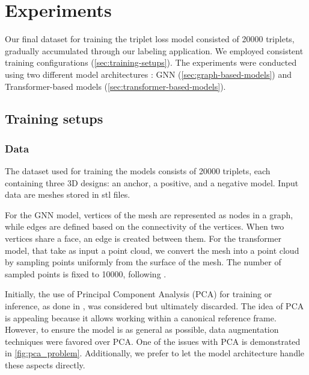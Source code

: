 \chapter{Experiments}
\label{sec:experiments}

Our final dataset for training the triplet loss model consisted of 20000 triplets, gradually accumulated through our labeling application. We employed consistent training configurations (\autoref{sec:training-setups}). The experiments were conducted using two different model architectures : GNN (\autoref{sec:graph-based-models}) and Transformer-based models (\autoref{sec:transformer-based-models}). 

\section{Training setups}
\label{sec:training-setups}

\subsection{Data}

The dataset used for training the models consists of 20000 triplets, each containing three 3D designs: an anchor, a positive, and a negative model. Input data are meshes stored in stl files.

For the GNN model, vertices of the mesh are represented as nodes in a graph, while edges are defined based on the connectivity of the vertices. When two vertices share a face, an edge is created between them. 
For the transformer model, that take as input a point cloud, we convert the mesh into a point cloud by sampling points uniformly from the surface of the mesh. The number of sampled points is fixed to 10000, following \cite{liuOpenShapeScaling3D2023}.

Initially, the use of Principal Component Analysis (PCA) for training or inference, as done in \cite{popRotationInvariantGraph2023}, was considered but ultimately discarded. The idea of PCA is appealing because it allows working within a canonical reference frame. However, to ensure the model is as general as possible, data augmentation techniques were favored over PCA. One of the issues with PCA is demonstrated in \autoref{fig:pca_problem}. Additionally, we prefer to let the model architecture handle these aspects directly.

\clearpage

